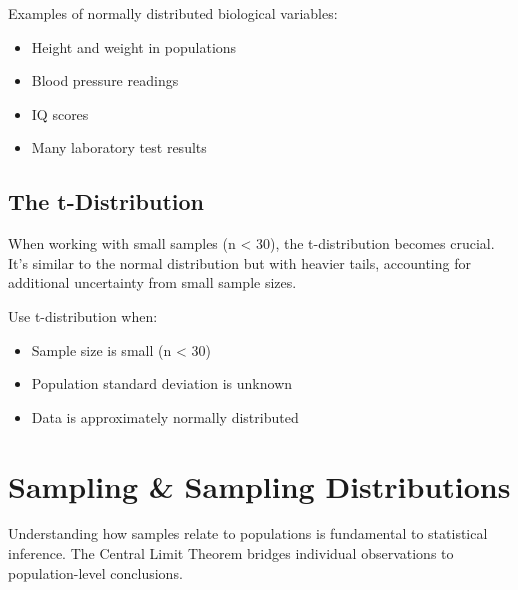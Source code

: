 \documentclass[
  11pt,
  letterpaper,
  oneside]{book}
\providecommand{\tightlist}{%
  \setlength{\itemsep}{0pt}\setlength{\parskip}{0pt}}\usepackage{longtable,booktabs,array}
\begin{document}
Examples of normally distributed biological variables:

\begin{itemize}
\tightlist
\item
  Height and weight in populations
\item
  Blood pressure readings
\item
  IQ scores
\item
  Many laboratory test results
\end{itemize}

\subsection{The t-Distribution}\label{the-t-distribution}

When working with small samples (n \textless{} 30), the t-distribution
becomes crucial. It's similar to the normal distribution but with
heavier tails, accounting for additional uncertainty from small sample
sizes.

\begin{tcolorbox}[enhanced jigsaw, toprule=.15mm, left=2mm, opacitybacktitle=0.6, colframe=quarto-callout-warning-color-frame, leftrule=.75mm, titlerule=0mm, coltitle=black, colbacktitle=quarto-callout-warning-color!10!white, toptitle=1mm, title=\textcolor{quarto-callout-warning-color}{\faExclamationTriangle}\hspace{0.5em}{When to Use t vs Normal}, bottomtitle=1mm, arc=.35mm, rightrule=.15mm, bottomrule=.15mm, breakable, opacityback=0, colback=white]

Use t-distribution when:

\begin{itemize}
\tightlist
\item
  Sample size is small (n \textless{} 30)
\item
  Population standard deviation is unknown
\item
  Data is approximately normally distributed
\end{itemize}

\end{tcolorbox}

\section{Sampling \& Sampling
Distributions}\label{sampling-sampling-distributions}

Understanding how samples relate to populations is fundamental to
statistical inference. The Central Limit Theorem bridges individual
observations to population-level conclusions.
\end{document}
